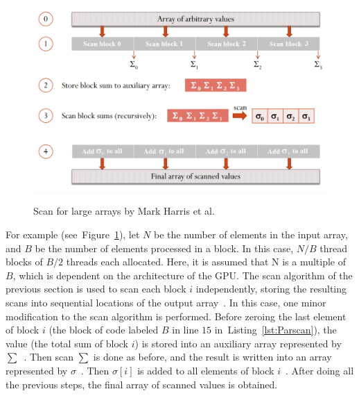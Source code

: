 \documentclass[Ingles]{ic-tese-v1}
\newcommand{\rfig}[1]{Figure~\ref{fig:#1}}
\newcommand{\rlst}[1]{Listing~\ref{lst:#1}}
\begin{document}
\begin{figure}[t]
	\centering
	\caption{Scan for large arrays by Mark Harris et al.}
	\includegraphics[scale=0.5]{images/largescan.png}
	\label{fig:largescan}
\end{figure}

For example (see~\rfig{largescan}), let $N$ be the number of elements in
the input array, and $B$ be the number of elements processed in a block. In this case,
$N/B$ thread blocks of $B/2$ threads each allocated. Here,  it is assumed that N
is a multiple of $B$, which is dependent on the architecture  of the GPU. The scan
algorithm of the previous section is used  to scan each block $i$ independently,
storing the resulting scans into sequential locations of the output
array~. In this case,  one minor modification to the scan algorithm is performed.
Before zeroing the last element of block $i$ (the block of code labeled $B$ in
line $15$ in~\rlst{Parscan}), the value (the total sum of block
$i$) is stored into an auxiliary array represented by $\sum$~. Then scan $\sum$
is done as before, and the  result is written into an array represented by
$\sigma$~. Then $\sigma[i]$ is added to all elements of block
$i$~. After doing all the previous steps, the final
array of scanned values is obtained.
\end{document}
